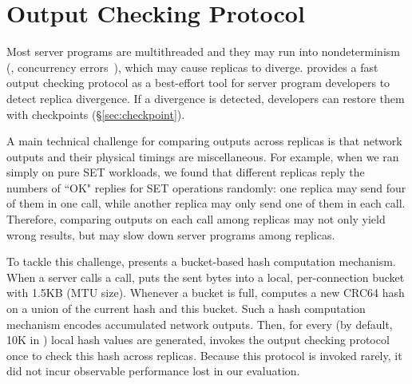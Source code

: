 \section{Output Checking Protocol} \label{sec:output}

Most server programs are multithreaded and they may run into nondeterminism 
(\eg, concurrency errors~\cite{lu:concurrency-bugs}), which may cause replicas 
to diverge. \xxx provides a fast output checking protocol as a best-effort tool 
for server program developers to detect replica divergence. If a divergence is 
detected, developers can restore them with \xxx 
checkpoints (\S\ref{sec:checkpoint}).

% 

A main technical challenge for comparing outputs across replicas is that 
network outputs and their physical timings are miscellaneous. For example, when 
we ran \redis simply on pure SET workloads, we found that different replicas 
reply the numbers of ``OK" replies for SET operations randomly: one replica may 
send four of them in one \send call, while another replica may only send one of 
them in each \send call. Therefore, comparing outputs on each \send call among 
replicas may not only yield wrong results, but may slow down server programs 
among replicas.

To tackle this challenge, \xxx presents a bucket-based hash computation 
mechanism. When a server calls a \send call, \xxx puts the sent bytes into a 
local, per-connection bucket with 1.5KB (MTU size). Whenever a bucket 
is full, \xxx computes a new CRC64 hash on a union of the current hash and this 
bucket. Such a hash computation mechanism encodes accumulated network outputs. 
Then, for every \thashcomp (by default, 10K in \xxx) local hash values 
are generated, \xxx invokes the output checking protocol once to check this 
hash across replicas. Because this protocol is invoked rarely, it did not incur 
observable performance lost in our evaluation.

